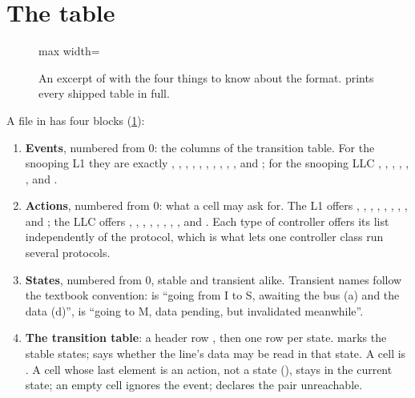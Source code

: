 \section{The table}\label{sec:fsm-format}

\begin{figure}[htbp]\centering
\begin{adjustbox}{max width=\textwidth}\end{adjustbox}
\caption{An excerpt of  with the four things to know about the format.
 prints every shipped table in full.}
\label{fig:fsm-annotated}
\end{figure}

A file in  has four blocks (\cref{fig:fsm-annotated}):

\begin{enumerate}
\item \textbf{Events}, numbered from 0: the columns of the transition table. For the snooping
  L1 they are exactly , , , ,
  , , , , ,
  ,  and ; for the snooping LLC
  , , , , ,
  ,  and .
\item \textbf{Actions}, numbered from 0: what a cell may ask for. The L1 offers ,
  , , , , , , ,
   and ; the LLC offers , ,
  , , , , ,
  ,  and . Each type of controller offers its
  list independently of the protocol, which is what lets one controller class run several
  protocols.
\item \textbf{States}, numbered from 0, stable and transient alike. Transient names follow the
  textbook convention:  is ``going from I to S, awaiting the bus (a) and the data
  (d)'',  is ``going to M, data pending, but invalidated meanwhile''.
\item \textbf{The transition table}: a header row ,
  then one row per state.  marks the stable states;  says whether
  the line's data may be read in that state. A cell is . A cell
  whose last element is an action, not a state (), stays in the current state;
  an empty cell ignores the event;  declares the pair unreachable.
\end{enumerate}

